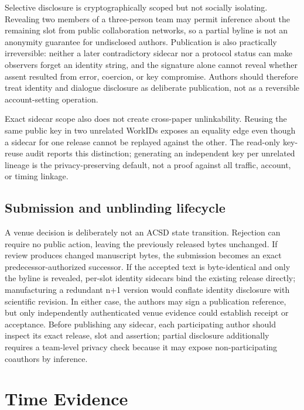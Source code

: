 \documentclass[acmsmall,screen,review,nonacm]{acmart}
\begin{document}
Selective disclosure is cryptographically scoped but not socially isolating.
Revealing two members of a three-person team may permit inference about the
remaining slot from public collaboration networks, so a partial byline is not
an anonymity guarantee for undisclosed authors. Publication is also practically
irreversible: neither a later contradictory sidecar nor a protocol status can
make observers forget an identity string, and the signature alone cannot reveal
whether assent resulted from error, coercion, or key compromise. Authors should
therefore treat identity and dialogue disclosure as deliberate publication,
not as a reversible account-setting operation.

Exact sidecar scope also does not create cross-paper unlinkability. Reusing the
same public key in two unrelated WorkIDs exposes an equality edge even though a
sidecar for one release cannot be replayed against the other. The read-only
key-reuse audit reports this distinction; generating an independent key per
unrelated lineage is the privacy-preserving default, not a proof against all
traffic, account, or timing linkage.

\subsection{Submission and unblinding lifecycle}

A venue decision is deliberately not an ACSD state transition. Rejection can
require no public action, leaving the previously released bytes unchanged. If
review produces changed manuscript bytes, the submission becomes an exact
predecessor-authorized successor. If the accepted text is byte-identical and
only the byline is revealed, per-slot identity sidecars bind the existing
release directly; manufacturing a redundant n+1 version would conflate
identity disclosure with scientific revision. In either case, the authors may
sign a publication reference, but only independently authenticated venue
evidence could establish receipt or acceptance. Before publishing any sidecar,
each participating author should inspect its exact release, slot and assertion;
partial disclosure additionally requires a team-level privacy check because it
may expose non-participating coauthors by inference.

\section{Time Evidence}
\end{document}
